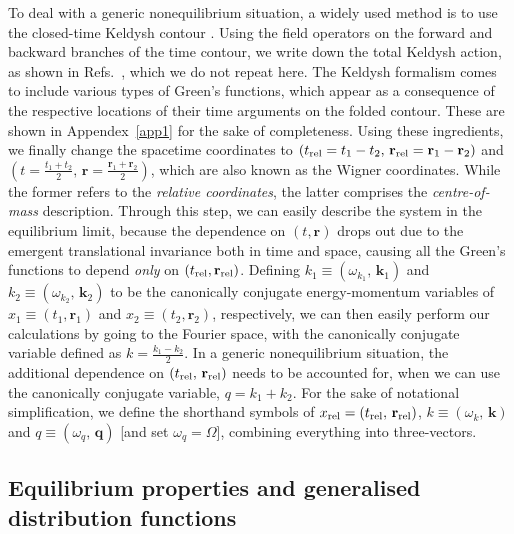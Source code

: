 \documentclass[aps, prb, onecolumn, nofootinbib, citeautoscript, 10pt]{revtex4-2}
\begin{document}
To deal with a generic nonequilibrium situation, a widely used method is to use the closed-time Keldysh contour \cite{kamenev}. Using the field operators on the forward and backward branches of the time contour, we write down the total Keldysh action, as shown in Refs.~\cite{ips-zero-mode, ips-kazi}, which we do not repeat here. 
The Keldysh formalism comes to include various types of Green’s functions, which appear as a consequence of the respective locations of their time arguments on the folded contour. These are shown in Appendex~\ref{app1} for the sake of completeness. 
Using these ingredients, we finally change the spacetime coordinates to $(t_{\rm rel}=t_1-t_2, \, \mathbf r_{\rm rel} =\mathbf r_1 -\mathbf r_2)$ and $(t=\frac{t_1 + t_2} {2}, \,  \mathbf r  = \frac{ \mathbf r_1 +  \mathbf r_2} {2})$, which are also known as the Wigner coordinates. While the former refers to the \textit{relative coordinates}, the latter comprises the \textit{centre-of-mass} description. Through this step, we can easily describe the system in the equilibrium limit, because the dependence on $(t, \mathbf r)$ drops out due to the emergent translational invariance both in time and space, causing all the Green's functions to depend \textit{only} on $(t_{\rm rel}, \mathbf r_{\rm rel})$. Defining $k_1\equiv (\omega_{k_1}, \, \mathbf k_1)$ and $k_2\equiv (\omega_{k_2}, \, \mathbf k_2)$ to be the canonically conjugate energy-momentum variables of $x_1\equiv(t_1,\mathbf r_1)$ and $x_2\equiv(t_2,\mathbf r_2)$, respectively, we can then easily perform our calculations by going to the Fourier space, with the canonically conjugate variable defined as $ k =\frac{ k_1 - k_2}{2} $.
In a generic nonequilibrium situation, the additional dependence on $(t_{\rm rel}, \, \mathbf r_{\rm rel})$ needs to be accounted for, when we can use the canonically conjugate variable, $  q=  k_1  +   k_2$.
For the sake of notational simplification, we define the shorthand symbols of $ x_{\rm rel}  = 
(t_{\rm rel}, \, \mathbf r_{\rm rel})$, $ k  \equiv (\omega_k, \, {\mathbf k})$ and $
q \equiv (  \omega_q, \,\mathbf q)$ [and set $\omega_q=\Omega $], combining everything into three-vectors.

\subsection{Equilibrium properties and generalised distribution functions} 
\end{document}
